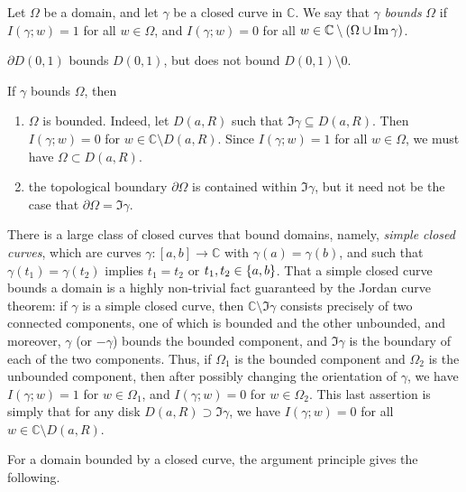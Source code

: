 \begin{definition}
	Let \( \Omega \) be a domain, and let \( \gamma \) be a closed curve in \( \mathbb C \).
	We say that \( \gamma \) \textit{bounds} \( \Omega \) if \( I(\gamma;w) = 1 \) for all \( w \in \Omega \), and \( I(\gamma;w) = 0 \) for all \( w \in \mathbb C \setminus \qty(\Omega \cup \Im \gamma) \).
\end{definition}
\begin{example}
	\( \partial D(0,1) \) bounds \( D(0,1) \), but does not bound \( D(0,1) \setminus \qty{0} \).
\end{example}
\begin{remark}
	If \( \gamma \) bounds \( \Omega \), then
	\begin{enumerate}
		\item \( \Omega \) is bounded.
			Indeed, let \( D(a,R) \) such that \( \Im \gamma \subseteq D(a,R) \).
			Then \( I(\gamma;w) = 0 \) for \( w \in \mathbb C \setminus D(a,R) \).
			Since \( I(\gamma;w) = 1 \) for all \( w \in \Omega \), we must have \( \Omega \subset D(a,R) \).
		\item the topological boundary \( \partial \Omega \) is contained within \( \Im \gamma \), but it need not be the case that \( \partial \Omega = \Im \gamma \).
	\end{enumerate}
	There is a large class of closed curves that bound domains, namely, \textit{simple closed curves}, which are curves \( \gamma \colon [a,b] \to \mathbb C \) with \( \gamma(a) = \gamma(b) \), and such that \( \gamma(t_1) = \gamma(t_2) \) implies \( t_1 = t_2 \) or \( t_1, t_2 \in \qty{a,b} \).
	That a simple closed curve bounds a domain is a highly non-trivial fact guaranteed by the Jordan curve theorem: if \( \gamma \) is a simple closed curve, then \( \mathbb C \setminus \Im \gamma \) consists precisely of two connected components, one of which is bounded and the other unbounded, and moreover, \( \gamma \) (or \( -\gamma \)) bounds the bounded component, and \( \Im \gamma \) is the boundary of each of the two components.
	Thus, if \( \Omega_1 \) is the bounded component and \( \Omega_2 \) is the unbounded component, then after possibly changing the orientation of \( \gamma \), we have \( I(\gamma;w) = 1 \) for \( w \in \Omega_1 \), and \( I(\gamma;w) = 0 \) for \( w \in \Omega_2 \).
	This last assertion is simply that for any disk \( D(a,R) \supset \Im \gamma \), we have \( I(\gamma;w) = 0 \) for all \( w \in \mathbb C \setminus D(a,R) \).
\end{remark}
For a domain bounded by a closed curve, the argument principle gives the following.
